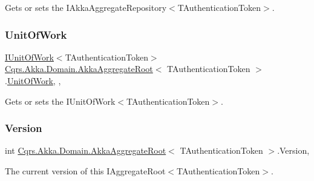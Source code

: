 Gets or sets the I\+Akka\+Aggregate\+Repository$<$\+T\+Authentication\+Token$>$. 

\mbox{\label{classCqrs_1_1Akka_1_1Domain_1_1AkkaAggregateRoot_a58b79dc3e0d837e58d95f5cfeb2da9a1_a58b79dc3e0d837e58d95f5cfeb2da9a1}} 
\subsubsection{\texorpdfstring{Unit\+Of\+Work}{UnitOfWork}}
{\footnotesize\ttfamily \hyperlink{interfaceCqrs_1_1Domain_1_1IUnitOfWork}{I\+Unit\+Of\+Work}$<$T\+Authentication\+Token$>$ \hyperlink{classCqrs_1_1Akka_1_1Domain_1_1AkkaAggregateRoot}{Cqrs.\+Akka.\+Domain.\+Akka\+Aggregate\+Root}$<$ T\+Authentication\+Token $>$.\hyperlink{classCqrs_1_1Domain_1_1UnitOfWork}{Unit\+Of\+Work}\hspace{0.3cm}{\ttfamily [get]}, {\ttfamily [set]}, {\ttfamily [protected]}}



Gets or sets the I\+Unit\+Of\+Work$<$\+T\+Authentication\+Token$>$. 

\mbox{\label{classCqrs_1_1Akka_1_1Domain_1_1AkkaAggregateRoot_a4b526322c63542b1da2a700ff1b48d0c_a4b526322c63542b1da2a700ff1b48d0c}} 
\subsubsection{\texorpdfstring{Version}{Version}}
{\footnotesize\ttfamily int \hyperlink{classCqrs_1_1Akka_1_1Domain_1_1AkkaAggregateRoot}{Cqrs.\+Akka.\+Domain.\+Akka\+Aggregate\+Root}$<$ T\+Authentication\+Token $>$.Version\hspace{0.3cm}{\ttfamily [get]}, {}}



The current version of this I\+Aggregate\+Root$<$\+T\+Authentication\+Token$>$. 

